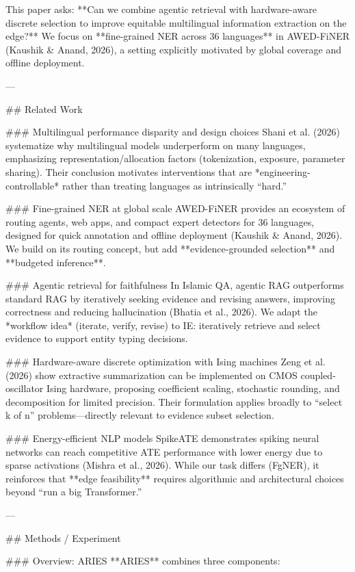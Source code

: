 This paper asks: **Can we combine agentic retrieval with hardware-aware discrete selection to improve equitable multilingual information extraction on the edge?** We focus on **fine-grained NER across 36 languages** in AWED-FiNER (Kaushik & Anand, 2026), a setting explicitly motivated by global coverage and offline deployment.

---

## Related Work  

### Multilingual performance disparity and design choices  
Shani et al. (2026) systematize why multilingual models underperform on many languages, emphasizing representation/allocation factors (tokenization, exposure, parameter sharing). Their conclusion motivates interventions that are *engineering-controllable* rather than treating languages as intrinsically “hard.”

### Fine-grained NER at global scale  
AWED-FiNER provides an ecosystem of routing agents, web apps, and compact expert detectors for 36 languages, designed for quick annotation and offline deployment (Kaushik & Anand, 2026). We build on its routing concept, but add **evidence-grounded selection** and **budgeted inference**.

### Agentic retrieval for faithfulness  
In Islamic QA, agentic RAG outperforms standard RAG by iteratively seeking evidence and revising answers, improving correctness and reducing hallucination (Bhatia et al., 2026). We adapt the *workflow idea* (iterate, verify, revise) to IE: iteratively retrieve and select evidence to support entity typing decisions.

### Hardware-aware discrete optimization with Ising machines  
Zeng et al. (2026) show extractive summarization can be implemented on CMOS coupled-oscillator Ising hardware, proposing coefficient scaling, stochastic rounding, and decomposition for limited precision. Their formulation applies broadly to “select k of n” problems—directly relevant to evidence subset selection.

### Energy-efficient NLP models  
SpikeATE demonstrates spiking neural networks can reach competitive ATE performance with lower energy due to sparse activations (Mishra et al., 2026). While our task differs (FgNER), it reinforces that **edge feasibility** requires algorithmic and architectural choices beyond “run a big Transformer.”

---

## Methods / Experiment  

### Overview: ARIES  
**ARIES** combines three components:

